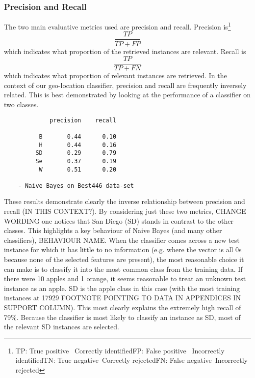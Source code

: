 \documentclass[twocolumn]{article}
\begin{document}
\subsubsection{Precision and Recall}
The two main evaluative metrics used are precision and recall. Precision is\footnote{\newline TP: True positive \,\,\,Correctly identified\newline FP: False positive \,\,\,Incorrectly identified\newline TN: True negative \,\hspace{0.1em}Correctly rejected\newline FN: False negative\, Incorrectly rejected} 
\begin{equation}
\frac{TP}{TP+FP}
\end{equation}
which indicates what proportion of the retrieved instances are relevant. Recall is
\begin{equation}
\frac{TP}{TP+FN}
\end{equation}
which indicates what proportion of relevant instances are retrieved.
\clearpage
In the context of our geo-location classifier, precision and recall are frequently inversely related. This is best demonstrated by looking at the performance of a classifier on two classes.
\begin{verbatim}
             precision    recall

          B       0.44      0.10
          H       0.44      0.16
         SD       0.29      0.79
         Se       0.37      0.19
          W       0.51      0.20
          
    - Naive Bayes on Best446 data-set
\end{verbatim}

These results demonstrate clearly the inverse relationship between precision and recall (IN THIS CONTEXT?). By considering just these two metrics, CHANGE WORDING one notices that San Diego (SD) stands in contrast to the other classes. This highlights a key behaviour of Naive Bayes (and many other classifiers), BEHAVIOUR NAME. When the classifier comes across a new test instance for which it has little to no information (e.g. where the vector is all 0s because none of the selected features are present), the most reasonable choice it can make is to classify it into the most common class from the training data. If there were 10 apples and 1 orange, it seems reasonable to treat an unknown test instance as an apple. SD is the apple class in this case (with the most training instances at 17929 FOOTNOTE POINTING TO DATA IN APPENDICES IN SUPPORT COLUMN). This most clearly explains the extremely high recall of 79\%. Because the classifier is most likely to classify an instance as SD, most of the relevant SD instances are selected. 
\end{document}
